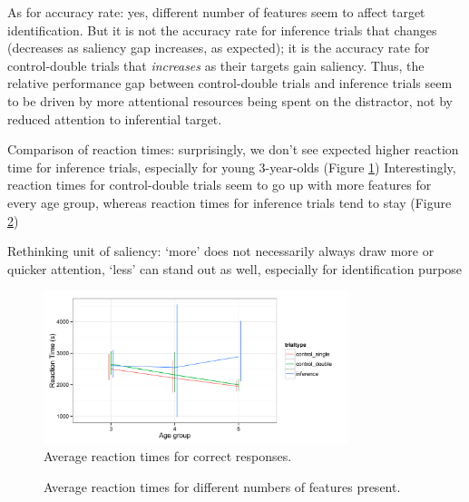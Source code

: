 \documentclass[10pt,letterpaper]{article}
\begin{document}
As for accuracy rate: yes, different number of features seem to affect target identification. But it is not the accuracy rate for inference trials that changes (decreases as saliency gap increases, as expected); it is the accuracy rate for control-double trials that \emph{increases} as their targets gain saliency. Thus, the relative performance gap between control-double trials and inference trials seem to be driven by more attentional resources being spent on the distractor, not by reduced attention to inferential target.

Comparison of reaction times: surprisingly, we don't see expected higher reaction time for inference trials, especially for young 3-year-olds (Figure \ref{fig:mixnumrt}) Interestingly, reaction times for control-double trials seem to go up with more features for every age group, whereas reaction times for inference trials tend to stay (Figure \ref{fig:mixnumrt2})

Rethinking unit of saliency: `more' does not necessarily always draw more or quicker attention, `less' can stand out as well, especially for identification purpose

\begin{figure}
\begin{center} 
\includegraphics[width=3.5in]{figures/150116-scmN1-rt_age1.pdf}
\caption{\label{fig:mixnumrt} Average reaction times for correct responses.}
\end{center} 
\end{figure}

\begin{figure}
	\caption{\label{fig:mixnumrt2} Average reaction times for different numbers of features present.}
\end{figure}
\end{document}

